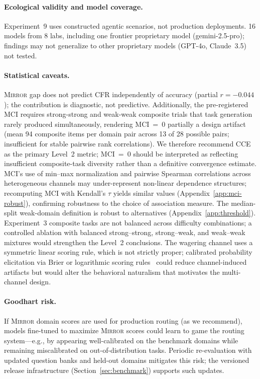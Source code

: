 \documentclass[10pt]{article}
\newcommand{\mirror}{\textsc{Mirror}}
\newcommand{\MCI}{MCI}
\newcommand{\CCE}{CCE}
\newcommand{\CFR}{CFR}
\begin{document}
\paragraph{Ecological validity and model coverage.}
Experiment~9 uses constructed agentic scenarios, not production deployments. 16 models from 8 labs, including one frontier proprietary model (gemini-2.5-pro); findings may not generalize to other proprietary models (GPT-4o, Claude~3.5) not tested.

\paragraph{Statistical caveats.}
\mirror{} gap does not predict \CFR{} independently of accuracy (partial $r = -0.044$); the contribution is diagnostic, not predictive. Additionally, the pre-registered \MCI{} requires strong-strong and weak-weak composite trials that task generation rarely produced simultaneously, rendering \MCI{}~=~0 partially a design artifact (mean 94 composite items per domain pair across 13 of 28 possible pairs; insufficient for stable pairwise rank correlations). We therefore recommend \CCE{} as the primary Level~2 metric; \MCI{}~=~0 should be interpreted as reflecting insufficient composite-task diversity rather than a definitive convergence estimate.
MCI's use of min--max normalization and pairwise Spearman correlations across
heterogeneous channels may under-represent non-linear dependence structures;
recomputing MCI with Kendall's $\tau$ yields similar values (Appendix~\ref{app:mci-robust}), confirming robustness to the choice of association measure.
The median-split weak-domain definition is robust to alternatives (Appendix~\ref{app:threshold}).
Experiment~3 composite tasks are not balanced across difficulty combinations;
a controlled ablation with balanced strong--strong, strong--weak, and weak--weak
mixtures would strengthen the Level~2 conclusions.
The wagering channel uses a symmetric linear scoring rule, which is not strictly
proper; calibrated probability elicitation via Brier or logarithmic scoring
rules~\citep{gneiting2007strictly} could reduce channel-induced artifacts but
would alter the behavioral naturalism that motivates the multi-channel design.

\paragraph{Goodhart risk.} If \mirror{} domain scores are used for production routing (as we recommend), models fine-tuned to maximize \mirror{} scores could learn to game the routing system---e.g., by appearing well-calibrated on the benchmark domains while remaining miscalibrated on out-of-distribution tasks. Periodic re-evaluation with updated question banks and held-out domains mitigates this risk; the versioned release infrastructure (Section~\ref{sec:benchmark}) supports such updates.
\end{document}
